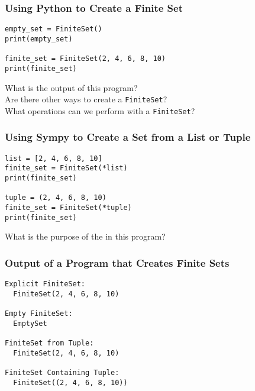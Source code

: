 \documentclass[14pt,aspectratio=169]{beamer}
\begin{document}
%
\begin{frame}[fragile]
  \frametitle{Using Python to Create a Finite Set}
  \normalsize
  \begin{minipage}{6in}
    \vspace*{.25in}
    \begin{verbatim}
empty_set = FiniteSet()
print(empty_set)

finite_set = FiniteSet(2, 4, 6, 8, 10)
print(finite_set)
    \end{verbatim}
  \end{minipage}
  \vspace*{.25in}
  \begin{center}
    \normalsize \noindent What is the output of this program? \\
    \normalsize \noindent Are there other ways to create a {\tt FiniteSet}? \\
    \normalsize \noindent What operations can we perform with a {\tt FiniteSet}? \\
  \end{center}
\end{frame}

%
\begin{frame}[fragile]
  \frametitle{Using Sympy to Create a Set from a List or Tuple}
  \normalsize
  \begin{minipage}{6in}
    \vspace*{.25in}
    \begin{verbatim}
list = [2, 4, 6, 8, 10]
finite_set = FiniteSet(*list)
print(finite_set)

tuple = (2, 4, 6, 8, 10)
finite_set = FiniteSet(*tuple)
print(finite_set)
    \end{verbatim}
  \end{minipage}
  \vspace*{.05in}
  \begin{center}
    \normalsize \noindent What is the purpose of the {\tt *} in this program? \\
  \end{center}
\end{frame}

%
\begin{frame}[fragile]
  \frametitle{Output of a Program that Creates Finite Sets}
  \normalsize
  \begin{minipage}{6in}
    \vspace*{.25in}
    \begin{verbatim}
Explicit FiniteSet:
  FiniteSet(2, 4, 6, 8, 10)

Empty FiniteSet:
  EmptySet

FiniteSet from Tuple:
  FiniteSet(2, 4, 6, 8, 10)

FiniteSet Containing Tuple:
  FiniteSet((2, 4, 6, 8, 10))
    \end{verbatim}
  \end{minipage}
\end{frame}
\end{document}
